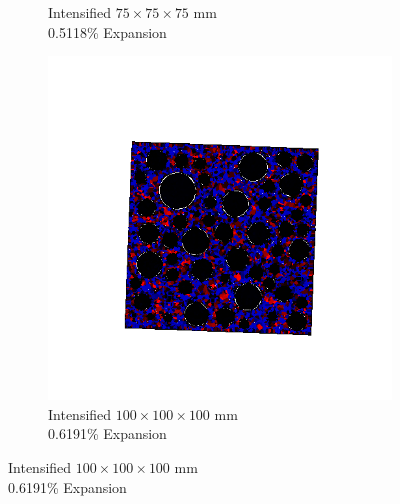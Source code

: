\begin{figure}[ht!]
\begin{subfigure}{.3\textwidth}
    \caption{Intensified $75 \times 75 \times 75$ mm  \\ 0.5118\% Expansion}
    \end{subfigure}
    \begin{subfigure}{.3\textwidth}
      \centering
      \includegraphics[width=.9\linewidth]{Files/exp_3D/DEF/A30X-1C_3_stress.png}
    \caption{Intensified $100 \times 100 \times 100$ mm \\  0.6191\% Expansion}
    \end{subfigure}%


\end{figure}
